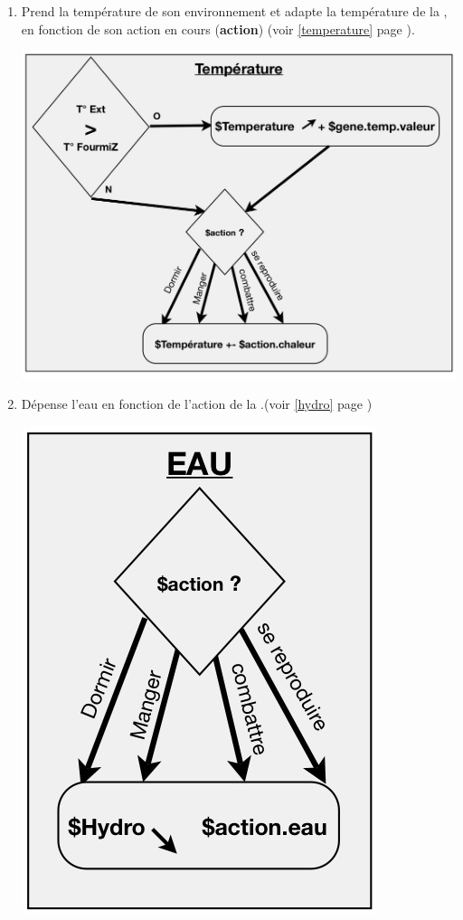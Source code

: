 \documentclass[french]{report}
\begin{document}
\begin{enumerate}
	\item Prend la température de son environnement et adapte la température de la \CoCiX, en fonction de son action en cours (\textbf{action}) (voir \ref{temperature} page \pageref{temperature}).\\
	\begin{center}
		\includegraphics[width=0.5\linewidth]{images/cortex01.jpg}
	\end{center}
		
	\item Dépense l'eau en fonction de l'action de la \CoCiX.(voir \ref{hydro} page \pageref{hydro})\\
	\begin{center}
		\includegraphics[width=0.5\linewidth]{images/cortex02.jpg}
	\end{center}
		

\end{enumerate}
\end{document}
